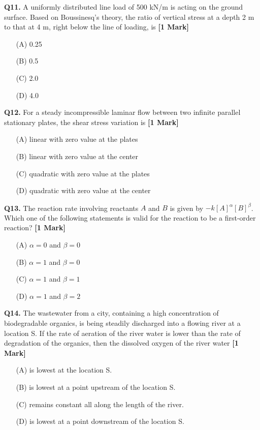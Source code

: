 \documentclass[11pt]{article}
\newcommand{\questiona}[2]{
    \noindent\textbf{Q#2.} #1 \hfill \textbf{[1 Mark]}
}
\begin{document}
\vspace{0.5cm}

\questiona{A uniformly distributed line load of 500 kN/m is acting on the ground surface. Based on Boussinesq's theory, the ratio of vertical stress at a depth 2 m to that at 4 m, right below the line of loading, is}{11}
\begin{enumerate}
    \item[(A)] 0.25
    \item[(B)] 0.5
    \item[(C)] 2.0
    \item[(D)] 4.0
\end{enumerate}

\vspace{0.5cm}

\questiona{For a steady incompressible laminar flow between two infinite parallel stationary plates, the shear stress variation is}{12}
\begin{enumerate}
    \item[(A)] linear with zero value at the plates
    \item[(B)] linear with zero value at the center
    \item[(C)] quadratic with zero value at the plates
    \item[(D)] quadratic with zero value at the center
\end{enumerate}

\vspace{0.5cm}

\questiona{The reaction rate involving reactants $A$ and $B$ is given by $-k[A]^{\alpha}[B]^{\beta}$. Which one of the following statements is valid for the reaction to be a first-order reaction?}{13}
\begin{enumerate}
    \item[(A)] $\alpha = 0$ and $\beta = 0$
    \item[(B)] $\alpha = 1$ and $\beta = 0$
    \item[(C)] $\alpha = 1$ and $\beta = 1$
    \item[(D)] $\alpha = 1$ and $\beta = 2$
\end{enumerate}

\vspace{0.5cm}

\questiona{The wastewater from a city, containing a high concentration of biodegradable organics, is being steadily discharged into a flowing river at a location S. If the rate of aeration of the river water is lower than the rate of degradation of the organics, then the dissolved oxygen of the river water}{14}
\begin{enumerate}
    \item[(A)] is lowest at the location S.
    \item[(B)] is lowest at a point upstream of the location S.
    \item[(C)] remains constant all along the length of the river.
    \item[(D)] is lowest at a point downstream of the location S.
\end{enumerate}
\end{document}
